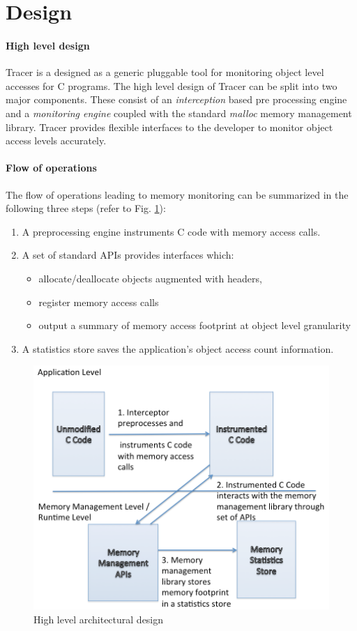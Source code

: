 \section{Design}
\label{sec:design}
\paragraph{High level design}
Tracer is a designed as a generic pluggable tool for monitoring object level accesses for C programs. The high level design of Tracer can be split into two major components. These consist of an {\emph{interception}} based pre processing engine and a {\emph{monitoring engine}} coupled with the standard {\emph{malloc}} memory management library. Tracer provides flexible interfaces to the developer to monitor object access levels accurately. 

\paragraph{Flow of operations}
The flow of operations leading to memory monitoring can be summarized in the following three steps (refer to Fig. \ref{fig:architecture}):
\begin{enumerate}
\item A preprocessing engine instruments C code with memory access calls.
\item A set of standard APIs provides interfaces which:
\begin{itemize}
\item allocate/deallocate objects augmented with headers, 
\item register memory access calls
\item output a summary of memory access footprint at object level granularity
\end{itemize}
\item A statistics store saves the application's object access count information.
\end{enumerate}

\begin{figure}[!ht]
\caption{High level architectural design}
\label{fig:architecture}
\includegraphics[scale=0.3]{./images/architecture.png}
\end{figure}

